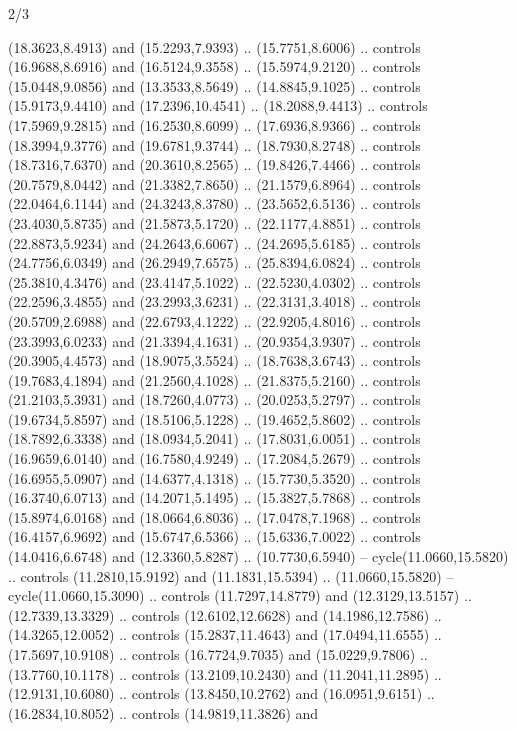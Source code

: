 \begin{flagdescription}{2/3}
\begin{scope}[yshift=\flagwidth,scale=\flagwidth/1241.93737]
\begin{scope}[y=-1mm, x=1mm,draw=gold,fill=blue,line join=miter,miter limit=4,line width=1.8\lw]
\begin{scope}[y=1mm, x=1mm, yscale=-1,shift={(573.68mm+\str,145.75)}]
\begin{scope}[scale=1.35,shift={(-9,-3)}]
\begin{scope}[scale=0.55]
\begin{scope}[scale=1.333]
    (18.3623,8.4913) and (15.2293,7.9393) .. (15.7751,8.6006) .. controls
    (16.9688,8.6916) and (16.5124,9.3558) .. (15.5974,9.2120) .. controls
    (15.0448,9.0856) and (13.3533,8.5649) .. (14.8845,9.1025) .. controls
    (15.9173,9.4410) and (17.2396,10.4541) .. (18.2088,9.4413) .. controls
    (17.5969,9.2815) and (16.2530,8.6099) .. (17.6936,8.9366) .. controls
    (18.3994,9.3776) and (19.6781,9.3744) .. (18.7930,8.2748) .. controls
    (18.7316,7.6370) and (20.3610,8.2565) .. (19.8426,7.4466) .. controls
    (20.7579,8.0442) and (21.3382,7.8650) .. (21.1579,6.8964) .. controls
    (22.0464,6.1144) and (24.3243,8.3780) .. (23.5652,6.5136) .. controls
    (23.4030,5.8735) and (21.5873,5.1720) .. (22.1177,4.8851) .. controls
    (22.8873,5.9234) and (24.2643,6.6067) .. (24.2695,5.6185) .. controls
    (24.7756,6.0349) and (26.2949,7.6575) .. (25.8394,6.0824) .. controls
    (25.3810,4.3476) and (23.4147,5.1022) .. (22.5230,4.0302) .. controls
    (22.2596,3.4855) and (23.2993,3.6231) .. (22.3131,3.4018) .. controls
    (20.5709,2.6988) and (22.6793,4.1222) .. (22.9205,4.8016) .. controls
    (23.3993,6.0233) and (21.3394,4.1631) .. (20.9354,3.9307) .. controls
    (20.3905,4.4573) and (18.9075,3.5524) .. (18.7638,3.6743) .. controls
    (19.7683,4.1894) and (21.2560,4.1028) .. (21.8375,5.2160) .. controls
    (21.2103,5.3931) and (18.7260,4.0773) .. (20.0253,5.2797) .. controls
    (19.6734,5.8597) and (18.5106,5.1228) .. (19.4652,5.8602) .. controls
    (18.7892,6.3338) and (18.0934,5.2041) .. (17.8031,6.0051) .. controls
    (16.9659,6.0140) and (16.7580,4.9249) .. (17.2084,5.2679) .. controls
    (16.6955,5.0907) and (14.6377,4.1318) .. (15.7730,5.3520) .. controls
    (16.3740,6.0713) and (14.2071,5.1495) .. (15.3827,5.7868) .. controls
    (15.8974,6.0168) and (18.0664,6.8036) .. (17.0478,7.1968) .. controls
    (16.4157,6.9692) and (15.6747,6.5366) .. (15.6336,7.0022) .. controls
    (14.0416,6.6748) and (12.3360,5.8287) .. (10.7730,6.5940) --
    cycle(11.0660,15.5820) .. controls (11.2810,15.9192) and (11.1831,15.5394) ..
    (11.0660,15.5820) -- cycle(11.0660,15.3090) .. controls (11.7297,14.8779) and
    (12.3129,13.5157) .. (12.7339,13.3329) .. controls (12.6102,12.6628) and
    (14.1986,12.7586) .. (14.3265,12.0052) .. controls (15.2837,11.4643) and
    (17.0494,11.6555) .. (17.5697,10.9108) .. controls (16.7724,9.7035) and
    (15.0229,9.7806) .. (13.7760,10.1178) .. controls (13.2109,10.2430) and
    (11.2041,11.2895) .. (12.9131,10.6080) .. controls (13.8450,10.2762) and
    (16.0951,9.6151) .. (16.2834,10.8052) .. controls (14.9819,11.3826) and

\end{scope}
\end{scope}
\end{scope}
\end{scope}
\end{scope}
\end{scope}
\end{flagdescription}
